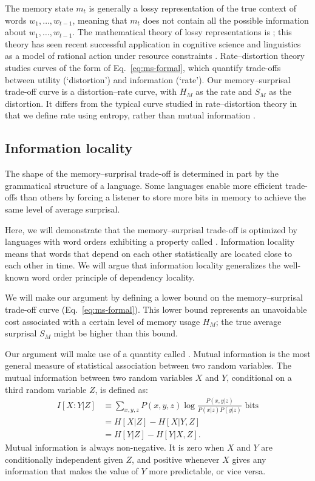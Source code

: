 The memory state $m_t$ is generally a lossy representation of the true context of words $w_1, \dots, w_{t-1}$, meaning that $m_t$ does not contain all the possible information about $w_1, \dots, w_{t-1}$. The mathematical theory of lossy representations is  \citep[for an overview and key results, see][pp. 301--347]{cover2006elements}; this theory has seen recent successful application in cognitive science and linguistics as a model of rational action under resource constraints \citep{sims,gershman,zaslavsky2018efficient}. Rate--distortion theory studies curves of the form of Eq.~\ref{eq:ms-formal}, which quantify trade-offs between utility (`distortion') and information (`rate'). Our memory--surprisal trade-off curve is a distortion--rate curve, with $H_M$ as the rate and $S_M$ as the distortion. It differs from the typical curve studied in rate--distortion theory in that we define rate using entropy, rather than mutual information \citep[see][for a discussion of some of the consequences of this formulation]{strouse-deterministic-2017}. 


\subsection{Information locality}
\label{sec:infoloc}

The shape of the memory--surprisal trade-off is determined in part by the grammatical structure of a language.
Some languages enable more efficient trade-offs than others by forcing a listener to store more bits in memory to achieve the same level of average surprisal.

Here, we will demonstrate that the memory--surprisal trade-off is optimized by languages with word orders exhibiting a property called . Information locality means that words that depend on each other statistically are located close to each other in time. We will argue that information locality generalizes the well-known word order principle of dependency locality.

We will make our argument by defining a lower bound on the memory--surprisal trade-off curve (Eq.~\ref{eq:ms-formal}). This lower bound represents an unavoidable cost associated with a certain level of memory usage $H_M$; the true average surprisal $S_M$ might be higher than this bound. 

Our argument will make use of a quantity called . Mutual information is the most general measure of statistical association between two random variables. The mutual information between two random variables $X$ and $Y$, conditional on a third random variable $Z$, is defined as:
\begin{align}
\label{eq:mi}
    I[X:Y|Z] &\equiv \sum_{x,y,z} P(x,y,z) \log \frac{P(x,y|z)}{P(x|z)P(y|z)} \text{ bits} \\
    \nonumber
    &= H[X|Z] - H[X|Y,Z] \\
    \nonumber
    &= H[Y|Z] - H[Y|X,Z].
\end{align}
Mutual information is always non-negative. It is zero when $X$ and $Y$ are conditionally independent given $Z$, and positive whenever $X$ gives any information that makes the value of $Y$ more predictable, or vice versa. 

